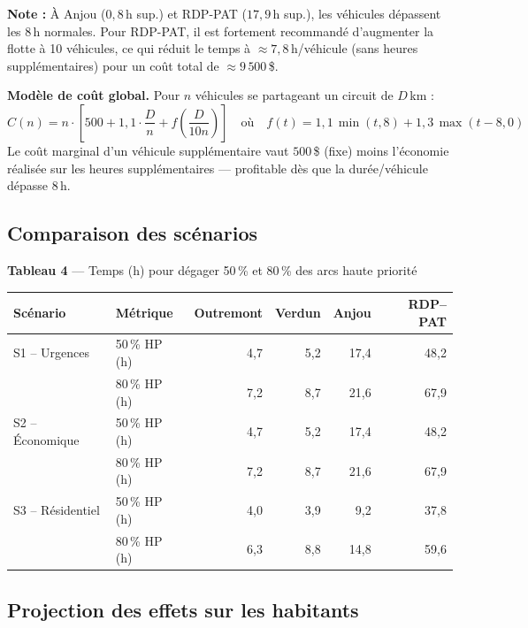 \documentclass[11pt,a4paper]{article}
\begin{document}
\noindent\textbf{Note :} \`A Anjou ($0{,}8$\,h sup.) et RDP-PAT ($17{,}9$\,h sup.),
les v\'ehicules d\'epassent les 8\,h normales. Pour RDP-PAT, il est fortement
recommand\'e d'augmenter la flotte \`a 10 v\'ehicules, ce qui r\'eduit le temps
\`a $\approx 7{,}8$\,h/v\'ehicule (sans heures suppl\'ementaires) pour un
co\^ut total de $\approx 9\,500$\,\$.

\medskip
\noindent\textbf{Mod\`ele de co\^ut global.}
Pour $n$ v\'ehicules se partageant un circuit de $D$\,km :
\begin{equation}
  C(n) = n \cdot \left[500 + 1{,}1 \cdot \frac{D}{n}
  + f\!\left(\frac{D}{10n}\right)\right]
  \quad\text{o\`u}\quad
  f(t) = 1{,}1\,\min(t,8) + 1{,}3\,\max(t-8,0)
\end{equation}
Le co\^ut marginal d'un v\'ehicule suppl\'ementaire vaut $500$\,\$ (fixe) moins
l'\'economie r\'ealis\'ee sur les heures suppl\'ementaires --- profitable d\`es
que la dur\'ee/v\'ehicule d\'epasse 8\,h.

\subsection{Comparaison des sc\'enarios}

\begin{center}
\textbf{Tableau 4} --- Temps (h) pour d\'egager 50\,\% et 80\,\% des arcs haute priorit\'e\\[0.5em]
\begin{tabular}{|l|l|r|r|r|r|}
\hline
\textbf{Sc\'enario} & \textbf{M\'etrique} & \textbf{Outremont} & \textbf{Verdun} & \textbf{Anjou} & \textbf{RDP--PAT} \\
\hline
S1 -- Urgences     & 50\,\% HP (h) &  4,7 &  5,2 & 17,4 & 48,2 \\
                   & 80\,\% HP (h) &  7,2 &  8,7 & 21,6 & 67,9 \\
\hline
S2 -- \'Economique & 50\,\% HP (h) &  4,7 &  5,2 & 17,4 & 48,2 \\
                   & 80\,\% HP (h) &  7,2 &  8,7 & 21,6 & 67,9 \\
\hline
S3 -- R\'esidentiel & 50\,\% HP (h) &  4,0 &  3,9 &  9,2 & 37,8 \\
                   & 80\,\% HP (h) &  6,3 &  8,8 & 14,8 & 59,6 \\
\hline
\end{tabular}
\end{center}

\subsection{Projection des effets sur les habitants}
\end{document}
